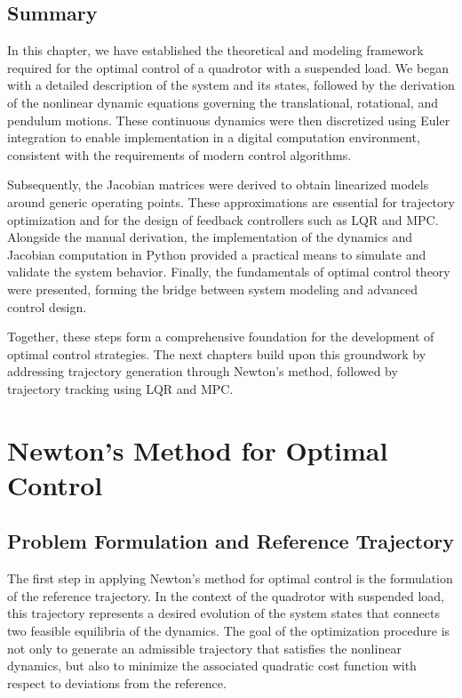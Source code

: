 \documentclass[a4paper,11pt,oneside]{book}
\begin{document}
\section{Summary}

In this chapter, we have established the theoretical and modeling framework required for the optimal control of a quadrotor with a suspended load. We began with a detailed description of the system and its states, followed by the derivation of the nonlinear dynamic equations governing the translational, rotational, and pendulum motions. These continuous dynamics were then discretized using Euler integration to enable implementation in a digital computation environment, consistent with the requirements of modern control algorithms.  

Subsequently, the Jacobian matrices were derived to obtain linearized models around generic operating points. These approximations are essential for trajectory optimization and for the design of feedback controllers such as LQR and MPC. Alongside the manual derivation, the implementation of the dynamics and Jacobian computation in Python provided a practical means to simulate and validate the system behavior. Finally, the fundamentals of optimal control theory were presented, forming the bridge between system modeling and advanced control design.  

Together, these steps form a comprehensive foundation for the development of optimal control strategies. The next chapters build upon this groundwork by addressing trajectory generation through Newton’s method, followed by trajectory tracking using LQR and MPC.


\chapter{Newton's Method for Optimal Control}
\label{chap:NewtonsMethod}

\section{Problem Formulation and Reference Trajectory}

The first step in applying Newton’s method for optimal control is the formulation of the reference trajectory. In the context of the quadrotor with suspended load, this trajectory represents a desired evolution of the system states that connects two feasible equilibria of the dynamics. The goal of the optimization procedure is not only to generate an admissible trajectory that satisfies the nonlinear dynamics, but also to minimize the associated quadratic cost function with respect to deviations from the reference.
\end{document}
